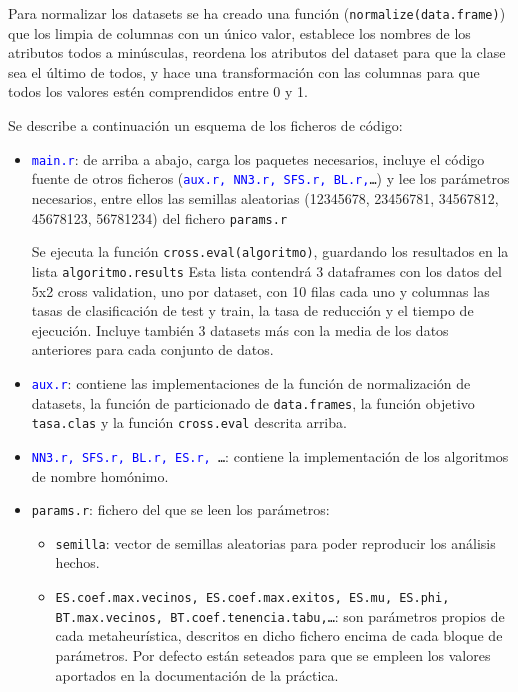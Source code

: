 \documentclass[a4paper,11pt]{article}
\newcommand{\blue}[1]{\textcolor{blue}{#1}}
\begin{document}
Para normalizar los datasets se ha creado una función (\texttt{normalize(data.frame)}) que los limpia de columnas con
un único valor, establece los nombres de los atributos todos a minúsculas, reordena los atributos del dataset para que
la clase sea el último de todos, y hace una transformación con las columnas para que todos los valores estén comprendidos
entre 0 y 1.

Se describe a continuación un esquema de los ficheros de código:
\begin{itemize}
 \item \texttt{\blue{main.r}}: de arriba a abajo, carga los paquetes necesarios, incluye el código fuente de otros ficheros
  (\texttt{\blue{aux.r, NN3.r, SFS.r, BL.r,}\ldots}) y lee los parámetros necesarios, entre ellos las semillas aleatorias
  (12345678, 23456781, 34567812, 45678123, 56781234) del fichero \texttt{params.r}
  
  Se ejecuta la función \texttt{cross.eval(algoritmo)}, guardando los resultados en la lista \texttt{algoritmo.results}
  Esta lista contendrá 3 dataframes con los datos del 5x2 cross validation, uno por dataset, con 10 filas cada uno 
  y columnas las tasas de clasificación de test y train, la tasa de reducción y el tiempo de ejecución. 
  Incluye también 3 datasets más con la media de los datos anteriores para cada conjunto de datos.
 
 \item \texttt{\blue{aux.r}}: contiene las implementaciones de la función de normalización de datasets, la función de
 particionado de \texttt{data.frames}, la función objetivo \texttt{tasa.clas} y la función \texttt{cross.eval}
 descrita arriba.
 
 \item \texttt{\blue{NN3.r, SFS.r, BL.r, ES.r, }\ldots}: contiene la implementación de los algoritmos de nombre 
 homónimo.
 
 \item \texttt{params.r}: fichero del que se leen los parámetros:
  \begin{itemize}
    \item \texttt{semilla}: vector de semillas aleatorias para poder reproducir los análisis hechos.
    \item \texttt{ES.coef.max.vecinos, ES.coef.max.exitos, ES.mu, ES.phi, \\BT.max.vecinos, BT.coef.tenencia.tabu,\ldots}:
    son parámetros propios de cada metaheurística, descritos en dicho fichero encima de cada bloque de parámetros.
    Por defecto están seteados para que se empleen los valores aportados en la documentación de la práctica.
  \end{itemize}
 \end{itemize}
 
\end{document}
